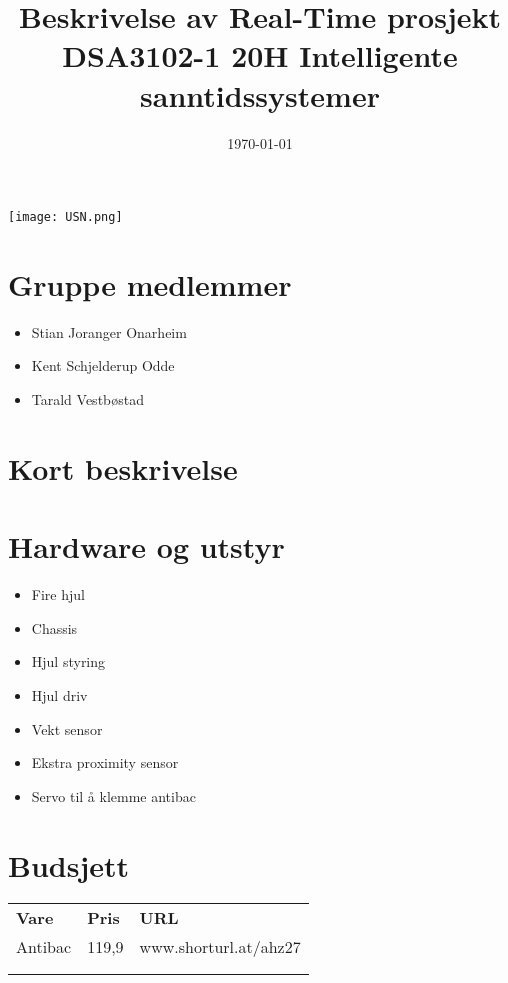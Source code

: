 \documentclass{article}
\title{Beskrivelse av Real-Time prosjekt \large\\
DSA3102-1 20H Intelligente sanntidssystemer}
\date{\today}
\begin{document}
\maketitle
\thispagestyle{empty}
\begin{center}
\texttt{[image: USN.png]}
\end{center}


\newpage
\section{Gruppe medlemmer}
	\begin{itemize}
		\item{Stian Joranger Onarheim}
		\item{Kent Schjelderup Odde}
		\item{Tarald Vestbøstad}
	\end{itemize}
\newpage
\section{Kort beskrivelse}
\newpage
\section{Hardware og utstyr}
	\begin{itemize}
		\item{Fire hjul}
		\item{Chassis}
		\item{Hjul styring}
		\item{Hjul driv}
		\item{Vekt sensor}
		\item{Ekstra proximity sensor}
		\item{Servo til å klemme antibac}
	\end{itemize}
\newpage
\section{Budsjett}
\begin{table}[]
\begin{tabular}{lll}
\textbf{Vare} & \textbf{Pris} & \textbf{URL}      \\
Antibac       & 119,9         & www.shorturl.at/ahz27 \\
              &               &                   \\
              &               &                  
\end{tabular}
\end{table}
\end{document}
